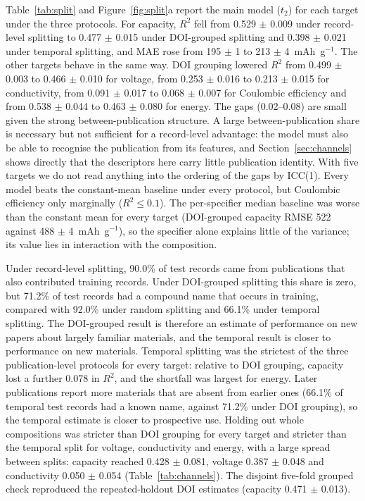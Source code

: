\documentclass[journal=jcisd8,manuscript=article,layout=traditional]{achemso}
\begin{document}
Table~\ref{tab:split} and Figure~\ref{fig:split}a report the main model ($t_2$) for each target under the three protocols. For capacity, $R^2$ fell from 0.529 $\pm$ 0.009 under record-level splitting to 0.477 $\pm$ 0.015 under DOI-grouped splitting and 0.398 $\pm$ 0.021 under temporal splitting, and MAE rose from 195 $\pm$ 1 to 213 $\pm$ 4~mAh~g$^{-1}$. The other targets behave in the same way. DOI grouping lowered $R^2$ from 0.499 $\pm$ 0.003 to 0.466 $\pm$ 0.010 for voltage, from 0.253 $\pm$ 0.016 to 0.213 $\pm$ 0.015 for conductivity, from 0.091 $\pm$ 0.017 to 0.068 $\pm$ 0.007 for Coulombic efficiency and from 0.538 $\pm$ 0.044 to 0.463 $\pm$ 0.080 for energy. The gaps (0.02--0.08) are small given the strong between-publication structure. A large between-publication share is necessary but not sufficient for a record-level advantage: the model must also be able to recognise the publication from its features, and Section~\ref{sec:channels} shows directly that the descriptors here carry little publication identity. With five targets we do not read anything into the ordering of the gaps by ICC(1). Every model beats the constant-mean baseline under every protocol, but Coulombic efficiency only marginally ($R^2 \le 0.1$). The per-specifier median baseline was worse than the constant mean for every target (DOI-grouped capacity RMSE 522 against 488 $\pm$ 4~mAh~g$^{-1}$), so the specifier alone explains little of the variance; its value lies in interaction with the composition.

Under record-level splitting, 90.0\% of test records came from publications that also contributed training records. Under DOI-grouped splitting this share is zero, but 71.2\% of test records had a compound name that occurs in training, compared with 92.0\% under random splitting and 66.1\% under temporal splitting. The DOI-grouped result is therefore an estimate of performance on new papers about largely familiar materials, and the temporal result is closer to performance on new materials. Temporal splitting was the strictest of the three publication-level protocols for every target: relative to DOI grouping, capacity lost a further 0.078 in $R^2$, and the shortfall was largest for energy. Later publications report more materials that are absent from earlier ones (66.1\% of temporal test records had a known name, against 71.2\% under DOI grouping), so the temporal estimate is closer to prospective use. Holding out whole compositions was stricter than DOI grouping for every target and stricter than the temporal split for voltage, conductivity and energy, with a large spread between splits: capacity reached 0.428 $\pm$ 0.081, voltage 0.387 $\pm$ 0.048 and conductivity 0.050 $\pm$ 0.054 (Table~\ref{tab:channels}). The disjoint five-fold grouped check reproduced the repeated-holdout DOI estimates (capacity 0.471 $\pm$ 0.013).
\end{document}
